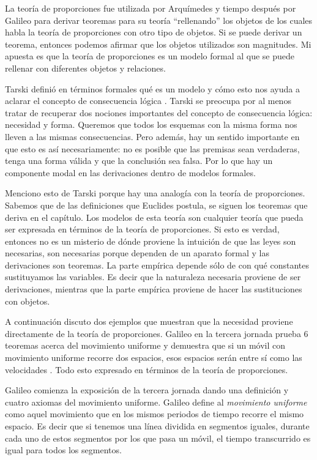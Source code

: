 La teoría de proporciones fue utilizada por Arquímedes y tiempo después por Galileo para derivar teoremas para su teoría ``rellenando'' los objetos de los cuales habla la teoría de proporciones con otro tipo de objetos. Si se puede derivar un teorema, entonces podemos afirmar que los objetos utilizados son magnitudes. Mi apuesta es que la teoría de proporciones es un modelo formal al que se puede rellenar con diferentes objetos y relaciones.

Tarski definió en términos formales qué es un modelo y cómo esto nos ayuda a aclarar el concepto de consecuencia lógica \cite{Tarski1956}. Tarski se preocupa por al menos tratar de recuperar dos nociones importantes del concepto de consecuencia lógica: necesidad y forma. \cite{Torrente2000} Queremos que todos los esquemas con la misma forma nos lleven a las mismas consecuencias. Pero además, hay un sentido importante en que esto es así necesariamente: no es posible que las premisas sean verdaderas, tenga una forma válida y que la conclusión sea falsa. Por lo que hay un componente modal en las derivaciones dentro de modelos formales.

Menciono esto de Tarski porque hay una analogía con la teoría de proporciones. Sabemos que de las definiciones que Euclides postula, se siguen los teoremas que deriva en el capítulo. Los modelos de esta teoría son cualquier teoría que pueda ser expresada en términos de la teoría de proporciones. Si esto es verdad, entonces no es un misterio de dónde proviene la intuición de que las leyes son necesarias, son necesarias porque dependen de un aparato formal y las derivaciones son teoremas. La parte empírica depende sólo de con qué constantes sustituyamos las variables. Es decir que la naturaleza necesaria proviene de ser derivaciones, mientras que la parte empírica proviene de hacer las sustituciones con objetos.

A continuación discuto dos ejemplos que muestran que la necesidad proviene directamente de la teoría de proporciones. Galileo en la tercera jornada prueba 6 teoremas acerca del movimiento uniforme y demuestra que si un móvil con movimiento uniforme recorre dos espacios, esos espacios serán entre sí como las velocidades \cite[p. 215]{galtre}. Todo esto expresado en términos de la teoría de proporciones.

Galileo comienza la exposición de la tercera jornada dando una definición y cuatro axiomas del movimiento uniforme. Galileo define al \textit{movimiento uniforme} como aquel movimiento que en los mismos periodos de tiempo recorre el mismo espacio. Es decir que si tenemos una línea dividida en segmentos iguales, durante cada uno de estos segmentos por los que pasa un móvil, el tiempo transcurrido es igual para todos los segmentos.

